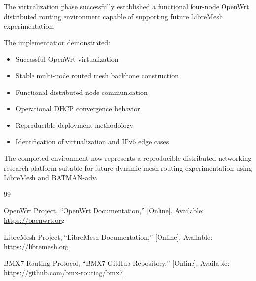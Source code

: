 \documentclass[conference]{IEEEtran}
\begin{document}
The virtualization phase successfully established a functional four-node OpenWrt distributed routing environment capable of supporting future LibreMesh experimentation.

The implementation demonstrated:

\begin{itemize}
    \item Successful OpenWrt virtualization
    \item Stable multi-node routed mesh backbone construction
    \item Functional distributed node communication
    \item Operational DHCP convergence behavior
    \item Reproducible deployment methodology
    \item Identification of virtualization and IPv6 edge cases
\end{itemize}

The completed environment now represents a reproducible distributed networking research platform suitable for future dynamic mesh routing experimentation using LibreMesh and BATMAN-adv.



\begin{thebibliography}{99}

OpenWrt Project, ``OpenWrt Documentation,'' [Online]. Available: \url{https://openwrt.org}

LibreMesh Project, ``LibreMesh Documentation,'' [Online]. Available: \url{https://libremesh.org}

BMX7 Routing Protocol, ``BMX7 GitHub Repository,'' [Online]. Available: \url{https://github.com/bmx-routing/bmx7}

\end{thebibliography}
\end{document}
